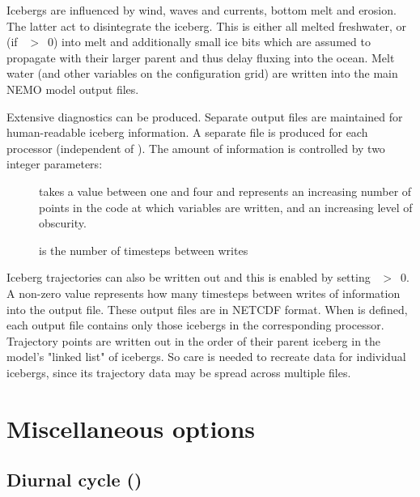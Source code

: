 \documentclass[../tex_main/NEMO_manual]{subfiles}
\begin{document}
Icebergs are influenced by wind, waves and currents, bottom melt and erosion.
The latter act to disintegrate the iceberg. This is either all melted freshwater, or 
(if ~$>$~0) into melt and additionally small ice bits
which are assumed to propagate with their larger parent and thus delay fluxing into the ocean.
Melt water (and other variables on the configuration grid) are written into the main NEMO model output files.

Extensive diagnostics can be produced.
Separate output files are maintained for human-readable iceberg information.
A separate file is produced for each processor (independent of ).
The amount of information is controlled by two integer parameters:
\begin{description}
\item[]  takes a value between one and four and represents 
an increasing number of points in the code at which variables are written, and an 
increasing level of obscurity.
\item[] is the number of timesteps between writes
\end{description}

Iceberg trajectories can also be written out and this is enabled by setting ~$>$~0.
A non-zero value represents how many timesteps between writes of information into the output file.
These output files are in NETCDF format.
When  is defined, each output file contains only those icebergs in the corresponding processor.
Trajectory points are written out in the order of their parent iceberg in the model's "linked list" of icebergs.
So care is needed to recreate data for individual icebergs, since its trajectory data may be spread across
multiple files.


\section{Miscellaneous options}
\label{sec:SBC_misc}

\subsection{Diurnal cycle (\protect{})}
\label{subsec:SBC_dcy}
%
\end{document}
